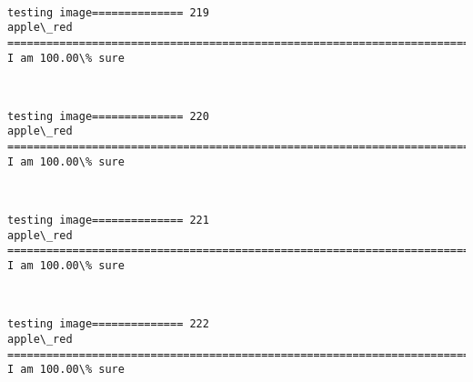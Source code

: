 \documentclass[11pt]{article}
\begin{document}
    \begin{center}
    \end{center}
    { \hspace*{\fill} \\}
    
    \begin{Verbatim}[commandchars=\\\{\}]
testing image============== 219
apple\_red
============================================================================
I am 100.00\% sure

    \end{Verbatim}

    \begin{center}
    \end{center}
    { \hspace*{\fill} \\}
    
    \begin{Verbatim}[commandchars=\\\{\}]
testing image============== 220
apple\_red
============================================================================
I am 100.00\% sure

    \end{Verbatim}

    \begin{center}
    \end{center}
    { \hspace*{\fill} \\}
    
    \begin{Verbatim}[commandchars=\\\{\}]
testing image============== 221
apple\_red
============================================================================
I am 100.00\% sure

    \end{Verbatim}

    \begin{center}
    \end{center}
    { \hspace*{\fill} \\}
    
    \begin{Verbatim}[commandchars=\\\{\}]
testing image============== 222
apple\_red
============================================================================
I am 100.00\% sure

    \end{Verbatim}
\end{document}
